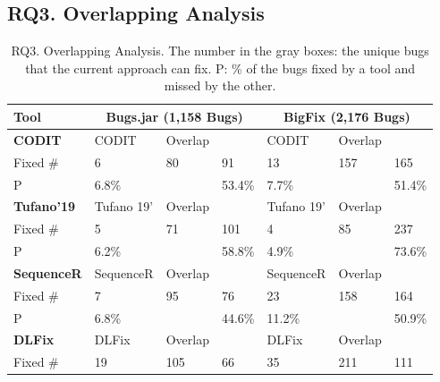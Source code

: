 \subsection{\bf RQ3. Overlapping Analysis}
\label{sec:overlap}

{\footnotesize{
\begin{table}[t]
  \caption{RQ3. Overlapping Analysis. The number in the gray boxes: the unique bugs that the current approach can fix. P: \% of the bugs fixed by a tool and missed by the other.}
  \vspace{-9pt}
	\begin{center}
		\renewcommand{\arraystretch}{1}
		\begin{tabular}{p{1cm}<{\centering}|p{1.1cm}<{\centering}|p{0.8cm}<{\centering}|p{0.7cm}<{\centering}|p{1.1cm}<{\centering}|p{0.8cm}<{\centering}|p{0.7cm}<{\centering}}\hline
			Tool &\multicolumn{3}{c|}{Bugs.jar (1,158 Bugs)}&\multicolumn{3}{c}{BigFix (2,176 Bugs)}\\
			\hline
			{\bf CODIT}             & CODIT   & Overlap   & \tool  & CODIT   & Overlap   & {\tool} \\
			\hline
			Fixed \#     & \cellcolor{mygray} 6  & 80   & \cellcolor{mygray} 91  & \cellcolor{mygray} 13 &  157  & \cellcolor{mygray} 165 \\
			P            & 6.8\%   &    & 53.4\%  & 7.7\%   &    & 51.4\% \\
			\hline
			{\bf Tufano'19}             & Tufano 19'   & Overlap   & \tool  & Tufano 19'   & Overlap   & \tool \\
			\hline
			Fixed \#     & \cellcolor{mygray} 5  &  71  & \cellcolor{mygray} 101 & \cellcolor{mygray}4 & 85   & \cellcolor{mygray}237 \\
			P            &  6.2\%  &    &  58.8\% &  4.9\%  &    & 73.6\% \\
			\hline
			{\bf SequenceR}             & SequenceR   & Overlap   & \tool  & SequenceR   & Overlap   & \tool \\
			\hline
			Fixed \#     & \cellcolor{mygray} 7  &   95 & \cellcolor{mygray} 76 & \cellcolor{mygray} 23 &  158  & \cellcolor{mygray} 164 \\
			P            &   6.8\% &    & 44.6\%  &   11.2\% &    & 50.9\% \\
			\hline
			{\bf DLFix} & DLFix   & Overlap   & \tool  & DLFix   & Overlap   & \tool \\
			\hline
			Fixed \#     & \cellcolor{mygray}  19 &  105  & \cellcolor{mygray} 66 & \cellcolor{mygray}35 &  211  & \cellcolor{mygray}111 \\

\end{tabular}
\end{center}
\end{table}}}
